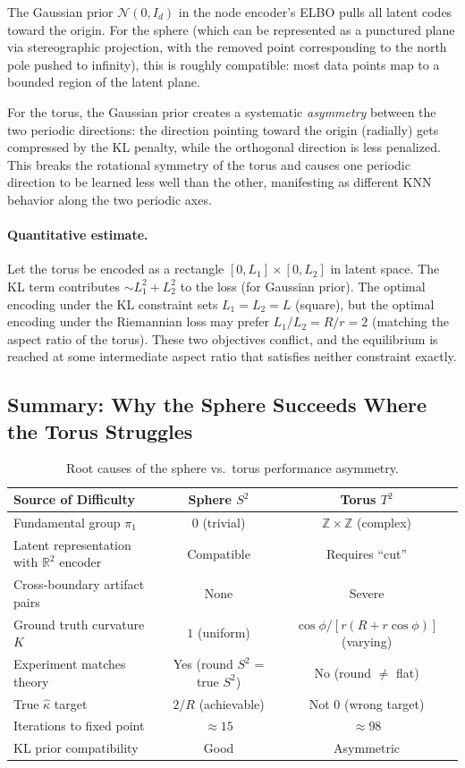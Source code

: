 \documentclass[11pt]{article}
\newcommand{\R}{\mathbb{R}}
\newcommand{\Z}{\mathbb{Z}}
\begin{document}
The Gaussian prior $\mathcal{N}(0, I_d)$ in the node encoder's ELBO pulls all
latent codes toward the origin. For the sphere (which can be represented as a
punctured plane via stereographic projection, with the removed point corresponding
to the north pole pushed to infinity), this is roughly compatible: most data
points map to a bounded region of the latent plane.

For the torus, the Gaussian prior creates a systematic \emph{asymmetry} between
the two periodic directions: the direction pointing toward the origin (radially)
gets compressed by the KL penalty, while the orthogonal direction is less
penalized. This breaks the rotational symmetry of the torus and causes one
periodic direction to be learned less well than the other, manifesting as
different KNN behavior along the two periodic axes.

\paragraph{Quantitative estimate.}
Let the torus be encoded as a rectangle $[0, L_1] \times [0, L_2]$ in latent
space. The KL term contributes $\sim L_1^2 + L_2^2$ to the loss (for Gaussian
prior). The optimal encoding under the KL constraint sets $L_1 = L_2 = L$
(square), but the optimal encoding under the Riemannian loss may prefer $L_1/L_2
= R/r = 2$ (matching the aspect ratio of the torus). These two objectives
conflict, and the equilibrium is reached at some intermediate aspect ratio that
satisfies neither constraint exactly.

\subsection{Summary: Why the Sphere Succeeds Where the Torus Struggles}

\begin{table}[h]
\centering
\caption{Root causes of the sphere vs.\ torus performance asymmetry.}
\begin{tabular}{lcc}
\toprule
Source of Difficulty & Sphere $S^2$ & Torus $T^2$ \\
\midrule
Fundamental group $\pi_1$ & $0$ (trivial) & $\Z \times \Z$ (complex) \\
Latent representation with $\R^2$ encoder & Compatible & Requires ``cut'' \\
Cross-boundary artifact pairs & None & Severe \\
Ground truth curvature $K$ & $1$ (uniform) & $\cos\phi / [r(R+r\cos\phi)]$ (varying) \\
Experiment matches theory & Yes (round $S^2$ = true $S^2$) & No (round $\ne$ flat) \\
True $\hat\kappa$ target & $2/R$ (achievable) & Not $0$ (wrong target) \\
Iterations to fixed point & $\approx 15$ & $\approx 98$ \\
KL prior compatibility & Good & Asymmetric \\
\bottomrule
\end{tabular}
\end{table}
\end{document}
